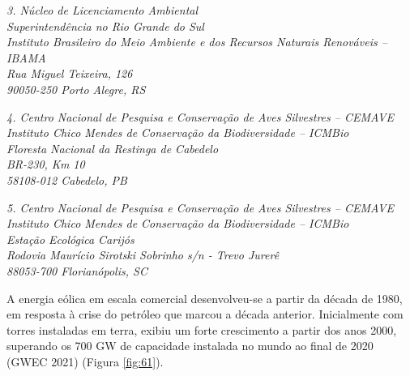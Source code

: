 \documentclass[
  oneside]{scrbook}
\begin{document}
\emph{3. Núcleo de Licenciamento Ambiental}\\
\emph{Superintendência no Rio Grande do Sul}\\
\emph{Instituto Brasileiro do Meio Ambiente e dos Recursos Naturais Renováveis -- IBAMA}\\
\emph{Rua Miguel Teixeira, 126}\\
\emph{90050-250 Porto Alegre, RS}

\emph{4. Centro Nacional de Pesquisa e Conservação de Aves Silvestres -- CEMAVE}\\
\emph{Instituto Chico Mendes de Conservação da Biodiversidade -- ICMBio}\\
\emph{Floresta Nacional da Restinga de Cabedelo}\\
\emph{BR-230, Km 10}\\
\emph{58108-012 Cabedelo, PB}

\emph{5. Centro Nacional de Pesquisa e Conservação de Aves Silvestres -- CEMAVE}\\
\emph{Instituto Chico Mendes de Conservação da Biodiversidade -- ICMBio}\\
\emph{Estação Ecológica Carijós}\\
\emph{Rodovia Maurício Sirotski Sobrinho s/n - Trevo Jurerê}\\
\emph{88053-700 Florianópolis, SC}

A energia eólica em escala comercial desenvolveu-se a partir da década de 1980, em resposta à crise do petróleo que marcou a década anterior. Inicialmente com torres instaladas em terra, exibiu um forte crescimento a partir dos anos 2000, superando os 700 GW de capacidade instalada no mundo ao final de 2020 (GWEC 2021) (Figura \ref{fig:61}).
\end{document}
